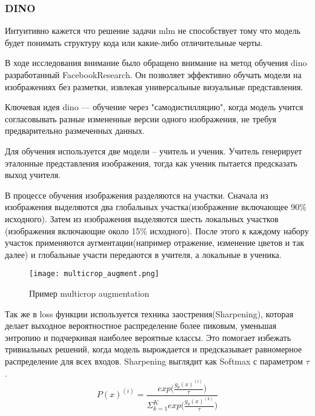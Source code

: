 \documentclass[../part_1.tex]{subfiles}
\begin{document}
    \subsubsection{DINO}

    \par Интуитивно кажется что решение задачи \acrshort{mlm} не способствует тому что модель будет понимать структуру кода или какие-либо отличительные черты. 
    \par В ходе исследования внимание было обращено внимание на метод обучения \acrshort{dino}\cite{caron2021emergingpropertiesselfsupervisedvision}\cite{oquab2024dinov2learningrobustvisual}\cite{darcet2024visiontransformersneedregisters} разработанный FacebookResearch. Он позволяет эффективно обучать модели на изображениях без разметки, извлекая универсальные визуальные представления. 
    \par Ключевая идея \acrshort{dino} — обучение через "самодистилляцию", когда модель учится согласовывать разные измененные версии одного изображения, не требуя предварительно размеченных данных.
    \par Для обучения используется две модели -- учитель и ученик. Учитель генерирует эталонные представления изображения, тогда как ученик пытается предсказать выход учителя. 
    \par В процессе обучения изображения разделяются на участки. Сначала из изображения выделяются два глобальных участка(изображение включающее 90\% исходного). Затем из изображения выделяются шесть локальных участков (изображения включающие около 15\% исходного). После этого к каждому набору участок применяются аугментации(например отражение, изменение цветов и так далее) и глобальные участи передаются в учителя, а локальные в ученика.
    \begin{figure}[h]
        \centering
        \texttt{[image: multicrop\_augment.png]}
        \caption{Пример multicrop augmentation}
        \label{fig:multicrop_augment}
    \end{figure}
    \par Так же в loss функции используется техника заострения(Sharpening), которая делает выходное вероятностное распределение более пиковым, уменьшая энтропию и подчеркивая наиболее вероятные классы. Это помогает избежать тривиальных решений, когда модель вырождается  и предсказывает равномерное распределение для всех входов. Sharpening выглядит как Softmax с параметром $\tau$.
    \begin{equation}
        \label{sharpening}
        P(x)^{(i)} = \frac{exp\Big(\frac{g_\theta(x)^{(i)}}{\tau}\Big)}{\Sigma^K_{k=1}exp\Big(\frac{g_\theta(x)^{(k)}}{\tau}\Big)}
    \end{equation}
\end{document}
